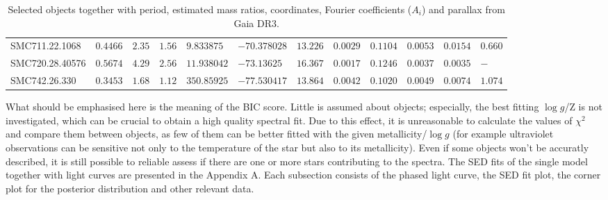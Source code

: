 \documentclass{pracalicmgr}
\begin{document}
\begin{table}[H]
{\begin{tabular}{llllllllllll}
    SMC711.22.1068  & $0.4466$  & $2.35$  & $1.56$ & $9.833875$   & $-70.378028$ & $13.226$ & $0.0029$  & $0.1104$ & $0.0053$  & $0.0154$ & $ 0.660$     \\[0.1cm]
    SMC720.28.40576 & $0.5674$ & $4.29$  & $2.56$ & $11.938042$  & $-73.13625$  & $16.367$  & $0.0017$ & $0.1246$ & $0.0037$  & $0.0035$ &  $-$    \\[0.1cm]
    SMC742.26.330   & $0.3453$ & $1.68$ & $1.12$ & $350.85925$  & $-77.530417$ & $13.864$ & $0.0042$   & $0.1020$ & $0.0049$ & $0.0074$ & $ 1.074$   \\[0.1cm]
    \hline
    \end{tabular}
    }
    \caption{Selected objects together with period, estimated mass ratios, coordinates, Fourier coefficients ($A_i$) and parallax from Gaia DR3.}\label{objects}
\end{table}
What should be emphasised here is the meaning of the BIC score. Little is assumed about objects; especially, the best fitting
$\log{g}$/Z is not investigated, which can be crucial to obtain a high quality spectral fit. Due to this effect, it is unreasonable to calculate the values of $\chi^2$ and compare them
between objects, as few of them can be better fitted with the given metallicity/$\log{g}$
(for example ultraviolet observations can be sensitive not only to the temperature of the star but also to its metallicity).
Even if some objects won't be accuratly described, it is still possible to reliable assess if there are one or more stars contributing to the spectra.
The SED fits of the single model together with light curves are presented in the Appendix A. Each subsection consists of the phased light curve, the
SED fit plot, the corner plot for the posterior distribution and other relevant data.
\newpage
\end{document}
